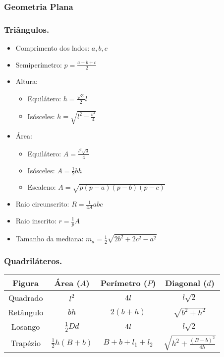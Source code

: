 \subsubsection{Geometria Plana}
\subsubsection*{Triângulos.}
\begin{multicols}{2}
	\begin{itemize}
		\item Comprimento dos lados: $a,b,c$
		\item Semiperímetro: $p = \frac{a+b+c}{2}$
		\item Altura:
		\begin{itemize}
			\item Equilátero: $h = \frac{\sqrt{3}}{2}l$
			\item Isósceles: $h = \sqrt{l^2 - \frac{b^2}{4}}$
		\end{itemize}
		\item Área:
		\begin{itemize}
			\item Equilátero: $A =\frac{l^2\sqrt{3}}{4}$
			\item Isósceles: $A =\frac{1}{2} bh$
			\item Escaleno: $A =\sqrt{p(p-a)(p-b)(p-c)}$
		\end{itemize}
		\item Raio circunscrito: $R = \frac{1}{4A}abc$
		\item Raio inscrito: $r = \frac{1}{p}A$
		\item Tamanho da mediana: $m_a = \frac{1}{2}\sqrt{2b^2+2c^2-a^2}$
	\end{itemize}
\end{multicols}

\subsubsection*{Quadriláteros.}
\begin{center}
	\begin{tabular}{|c|c|c|c|}
		Figura & Área ($A$) & Perímetro ($P$) & Diagonal ($d$) \\
		\hline
		Quadrado & $l^2$ & $4l$&$l\sqrt{2}$ \\
		\hline
		Retângulo&$bh$&$2(b+h)$&$\sqrt{b^2 + h^2}$\\
		\hline
		Losango&$\frac{1}{2}Dd$&$4l$&$l\sqrt{2}$\\
		\hline
		Trapézio&$\frac{1}{2}h(B+b)$&$B+b+l_1+l_2$&$\sqrt{h^2 + \frac{(B-b)^2}{4h}}$
		
	\end{tabular}
\end{center}

